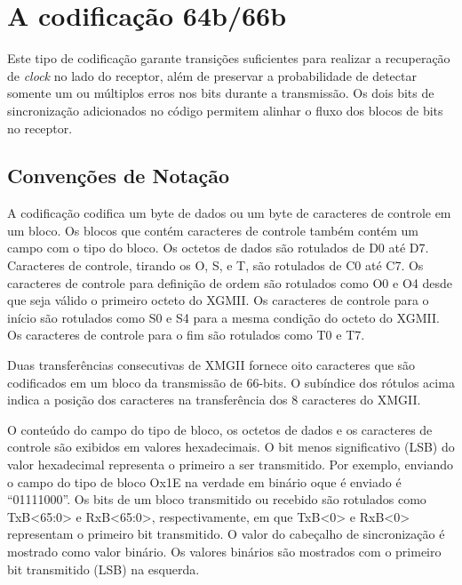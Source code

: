 
\chapter[A codificação 64b/66b]{A codificação 64b/66b} \label{codificacao64b66b}

Este tipo de codificação garante transições suficientes para realizar a recuperação de \textit{clock} no lado do receptor, além de preservar a probabilidade de detectar somente um ou múltiplos erros nos bits durante a transmissão. Os dois bits de sincronização adicionados no código permitem alinhar o fluxo dos blocos de bits no receptor.

\section{Convenções de Notação}

A codificação codifica um byte de dados ou um byte de caracteres de controle em um bloco. Os blocos que contém caracteres de controle também contém um campo com o tipo do bloco. Os octetos de dados são rotulados de D0 até D7. Caracteres de controle, tirando os O, S, e T, são rotulados de C0 até C7. Os caracteres de controle para definição de ordem são rotulados como O0 e O4 desde que seja válido o primeiro octeto do XGMII. Os caracteres de controle para o início são rotulados como S0 e S4 para a mesma condição do octeto do XGMII. Os caracteres de controle para o fim são rotulados como T0 e T7.

Duas transferências consecutivas de XMGII fornece oito caracteres que são codificados em um bloco da transmissão de 66-bits. O subíndice dos rótulos acima indica a posição dos caracteres na transferência dos 8 caracteres do XMGII.

O conteúdo do campo do tipo de bloco, os octetos de dados e os caracteres de controle são exibidos em valores hexadecimais. O bit menos significativo (LSB) do valor hexadecimal representa o primeiro a ser transmitido. Por exemplo, enviando o campo do tipo de bloco Ox1E na verdade em binário oque é enviado é “01111000”. Os bits de um bloco transmitido ou recebido são rotulados como TxB<65:0> e RxB<65:0>, respectivamente, em que TxB<0> e RxB<0> representam o primeiro bit transmitido. O valor do cabeçalho de sincronização é mostrado como valor binário. Os valores binários são mostrados com o primeiro bit transmitido (LSB) na esquerda.


